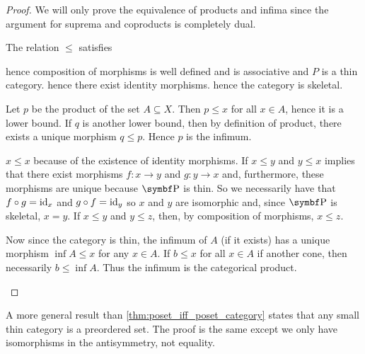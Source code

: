 \begin{proof}
  We will only prove the equivalence of products and infima since the argument for suprema and coproducts is completely dual.

  \begin{description}
    \Implies The relation \( \leq \) satisfies
    \begin{description}
       hence composition of morphisms is well defined and is associative and \( P \) is a thin category.
       hence there exist identity morphisms.
       hence the category is skeletal.
    \end{description}

    Let \( p \) be the product of the set \( A \subseteq X \). Then \( p \leq x \) for all \( x \in A \), hence it is a lower bound. If \( q \) is another lower bound, then by definition of product, there exists a unique morphism \( q \leq p \). Hence \( p \) is the infimum.

    \ImpliedBy\mbox{}
    \begin{description}
       \( x \leq x \) because of the existence of identity morphisms.
       If \( x \leq y \) and \( y \leq x \) implies that there exist morphisms \( f: x \to y \) and \( g: y \to x \) and, furthermore, these morphisms are unique because \( \Bold{P} \) is thin. So we necessarily have that \( f \circ g = \operatorname{id}_x \) and \( g \circ f = \operatorname{id}_y \) so \( x \) and \( y \) are isomorphic and, since \( \Bold{P} \) is skeletal, \( x = y \).
       If \( x \leq y \) and \( y \leq z \), then, by composition of morphisms, \( x \leq z \).
    \end{description}

    Now since the category is thin, the infimum of \( A \) (if it exists) has a unique morphism \( \inf A \leq x \) for any \( x \in A \). If \( b \leq x \) for all \( x \in A \) if another cone, then necessarily \( b \leq \inf A \). Thus the infimum is the categorical product.
  \end{description}
\end{proof}

\begin{remark}\label{remark:small_thin_category_isomorphic_to_preorder}
  A more general result than \cref{thm:poset_iff_poset_category} states that any small thin category is a preordered set. The proof is the same except we only have isomorphisms in the antisymmetry, not equality.
\end{remark}

